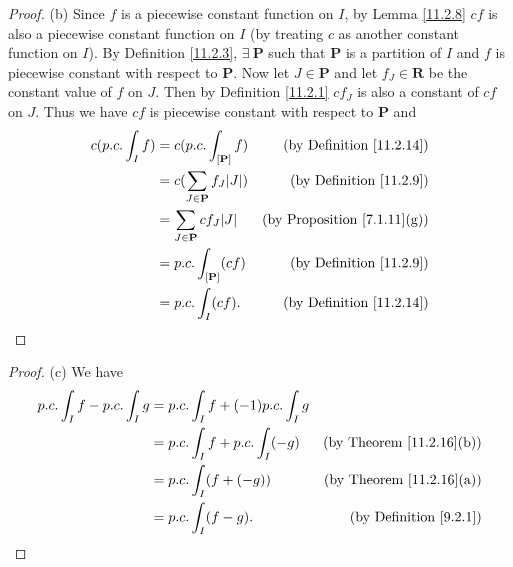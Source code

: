 \begin{proof}{(b)}
    Since \(f\) is a piecewise constant function on \(I\), by Lemma \ref{11.2.8} \(cf\) is also a piecewise constant function on \(I\) (by treating \(c\) as another constant function on \(I\)).
    By Definition \ref{11.2.3}, \(\exists\ \mathbf{P}\) such that \(\mathbf{P}\) is a partition of \(I\) and \(f\) is piecewise constant with respect to \(\mathbf{P}\).
    Now let \(J \in \mathbf{P}\) and let \(f_J \in \mathbf{R}\) be the constant value of \(f\) on \(J\).
    Then by Definition \ref{11.2.1} \(c f_J\) is also a constant of \(cf\) on \(J\).
    Thus we have \(cf\) is piecewise constant with respect to \(\mathbf{P}\) and
    \begin{align*}
        c (p.c. \int_I f) & = c (p.c. \int_{[\mathbf{P}]} f)           & \text{(by Definition \ref{11.2.14})}    \\
                          & = c (\sum_{J \in \mathbf{P}} f_J \abs*{J}) & \text{(by Definition \ref{11.2.9})}     \\
                          & = \sum_{J \in \mathbf{P}} c f_J \abs*{J}   & \text{(by Proposition \ref{7.1.11}(g))} \\
                          & = p.c. \int_{[\mathbf{P}]} (c f)           & \text{(by Definition \ref{11.2.9})}     \\
                          & = p.c. \int_I (c f).                       & \text{(by Definition \ref{11.2.14})}
    \end{align*}
\end{proof}

\begin{proof}{(c)}
    We have
    \begin{align*}
        p.c. \int_I f - p.c. \int_I g & = p.c. \int_I f + (-1) p.c. \int_I g                                        \\
                                      & = p.c. \int_I f + p.c. \int_I (-g)   & \text{(by Theorem \ref{11.2.16}(b))} \\
                                      & = p.c. \int_I (f + (-g))             & \text{(by Theorem \ref{11.2.16}(a))} \\
                                      & = p.c. \int_I (f - g).               & \text{(by Definition \ref{9.2.1})}
    \end{align*}
\end{proof}


